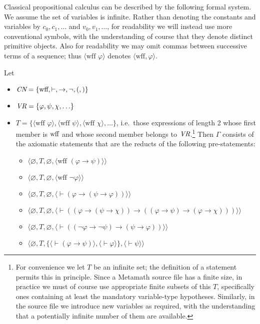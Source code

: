 Classical propositional calculus can be described by the following formal
system.  We assume the set of variables is infinite.  Rather than denoting the
constants and variables by $c_0, c_1, \ldots$ and $v_0, v_1, \ldots$, for
readability we will instead use more conventional symbols, with the
understanding of course that they denote distinct primitive objects.
Also for readability we may omit commas between successive terms of a
sequence; thus $\langle \mbox{wff\ } \varphi\rangle$ denotes
$\langle \mbox{wff}, \varphi\rangle$.

Let
\begin{itemize}
  \item[] $\mbox{\em CN}=\{\mbox{wff}, \vdash, \to, \lnot, (,)\}$
  \item[] $\mbox{\em VR}=\{\varphi,\psi,\chi,\ldots\}$
  \item[] $T = \{\langle \mbox{wff\ } \varphi\rangle,
             \langle \mbox{wff\ } \psi\rangle,
             \langle \mbox{wff\ } \chi\rangle,\ldots\}$, i.e.\ those
             expressions of length 2 whose first member is $\mbox{\rm wff}$
             and whose second member belongs to $\mbox{\em VR}$.\footnote{For
convenience we let $T$ be an infinite set; the definition of a statement
permits this in principle.  Since a Metamath source file has a finite size, in
practice we must of course use appropriate finite subsets of this $T$,
specifically ones containing at least the mandatory variable-type
hypotheses.  Similarly, in the source file we introduce new variables as
required, with the understanding that a potentially infinite number of
them are available.}
\noindent Then $\Gamma$ consists of the axiomatic statements that
are the reducts of the following pre-statements:
    \begin{itemize}
      \item[] $\langle\varnothing,T,\varnothing,
               \langle \mbox{wff\ }(\varphi\to\psi)\rangle\rangle$
      \item[] $\langle\varnothing,T,\varnothing,
               \langle \mbox{wff\ }\lnot\varphi\rangle\rangle$
      \item[] $\langle\varnothing,T,\varnothing,
               \langle \vdash(\varphi\to(\psi\to\varphi))
               \rangle\rangle$
      \item[] $\langle\varnothing,T,
               \varnothing,
               \langle \vdash((\varphi\to(\psi\to\chi))\to
               ((\varphi\to\psi)\to(\varphi\to\chi)))
               \rangle\rangle$
      \item[] $\langle\varnothing,T,
               \varnothing,
               \langle \vdash((\lnot\varphi\to\lnot\psi)\to
               (\psi\to\varphi))\rangle\rangle$
      \item[] $\langle\varnothing,T,
               \{\langle\vdash(\varphi\to\psi)\rangle,
                 \langle\vdash\varphi\rangle\},
               \langle\vdash\psi\rangle\rangle$
    \end{itemize}
\end{itemize}

